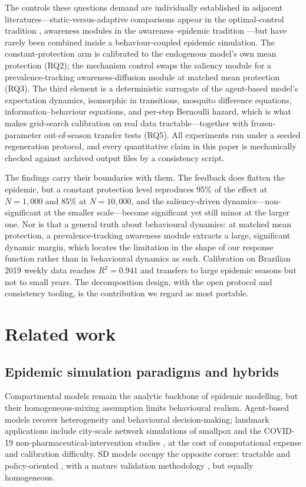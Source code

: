 \documentclass[]{interact}
\begin{document}
The controls these questions demand are individually established in adjacent literatures---static-versus-adaptive comparisons appear in the optimal-control tradition \cite{fenichel2011adaptive}, awareness modules in the awareness--epidemic tradition \cite{funk2009spread}---but have rarely been combined inside a behaviour-coupled epidemic simulation. The constant-protection arm is calibrated to the endogenous model's own mean protection (RQ2); the mechanism control swaps the saliency module for a prevalence-tracking awareness-diffusion module at matched mean protection (RQ3). The third element is a deterministic surrogate of the agent-based model's expectation dynamics, isomorphic in transitions, mosquito difference equations, information--behaviour equations, and per-step Bernoulli hazard, which is what makes grid-search calibration on real data tractable---together with frozen-parameter out-of-season transfer tests (RQ5). All experiments run under a seeded regeneration protocol, and every quantitative claim in this paper is mechanically checked against archived output files by a consistency script.

The findings carry their boundaries with them. The feedback does flatten the epidemic, but a constant protection level reproduces 95\% of the effect at $N{=}1{,}000$ and 85\% at $N{=}10{,}000$, and the saliency-driven dynamics---non-significant at the smaller scale---become significant yet still minor at the larger one. Nor is that a general truth about behavioural dynamics: at matched mean protection, a prevalence-tracking awareness module extracts a large, significant dynamic margin, which locates the limitation in the shape of our response function rather than in behavioural dynamics as such. Calibration on Brazilian 2019 weekly data reaches $R^2=0.941$ and transfers to large epidemic seasons but not to small years. The decomposition design, with the open protocol and consistency tooling, is the contribution we regard as most portable.

\section{Related work}

\subsection{Epidemic simulation paradigms and hybrids}

Compartmental models remain the analytic backbone of epidemic modelling, but their homogeneous-mixing assumption limits behavioural realism. Agent-based models recover heterogeneity and behavioural decision-making; landmark applications include city-scale network simulations of smallpox \cite{eubank2004modelling} and the COVID-19 non-pharmaceutical-intervention studies \cite{ferguson2020impact,prem2020effect,chinazzi2020effect}, at the cost of computational expense and calibration difficulty. SD models occupy the opposite corner: tractable and policy-oriented \cite{sterman2000business}, with a mature validation methodology \cite{barlas1996formal}, but equally homogeneous.
\end{document}
